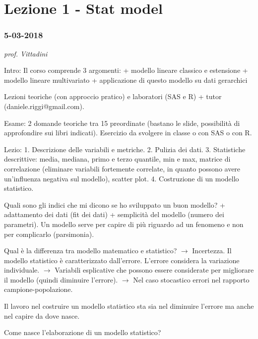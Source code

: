 \documentclass[]{article}
\date{}
\begin{document}
\section{Lezione 1 - Stat model}\label{lezione-1---stat-model}

\subsubsection{5-03-2018}\label{section}

\emph{prof. Vittadini}

Intro: Il corso comprende 3 argomenti: + modello lineare classico e
estensione + modello lineare multivariato + applicazione di questo
modello su dati gerarchici

Lezioni teoriche (con approccio pratico) e laboratori (SAS e R) + tutor
(daniele.riggi@gmail.com).

Esame: 2 domande teoriche tra 15 preordinate (bastano le slide,
possibilità di approfondire sui libri indicati). Esercizio da svolgere
in classe o con SAS o con R.

Lezio: 1. Descrizione delle variabili e metriche. 2. Pulizia dei dati.
3. Statistiche descrittive: media, mediana, primo e terzo quantile, min
e max, matrice di correlazione (eliminare variabili fortemente
correlate, in quanto possono avere un'influenza negativa sul modello),
scatter plot. 4. Costruzione di un modello statistico.

Quali sono gli indici che mi dicono se ho sviluppato un buon modello? +
adattamento dei dati (fit dei dati) + semplicità del modello (numero dei
parametri). Un modello serve per capire di più riguardo ad un fenomeno e
non per complicarlo (parsimonia).

Qual è la differenza tra modello matematico e statistico?
\(\rightarrow\) Incertezza. Il modello statistico è caratterizzato
dall'errore. L'errore considera la variazione individuale.
\(\rightarrow\) Variabili esplicative che possono essere considerate per
migliorare il modello (quindi diminuire l'errore). \(\rightarrow\) Nel
caso stocastico errori nel rapporto campione-popolazione.

Il lavoro nel costruire un modello statistico sta sia nel diminuire
l'errore ma anche nel capire da dove nasce. 

Come nasce l'elaborazione di un modello statistico?
\end{document}
